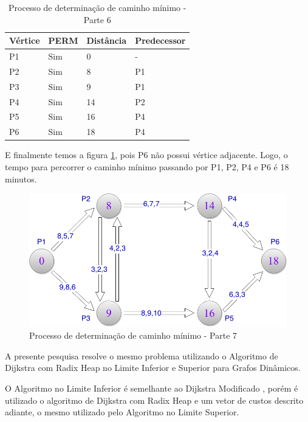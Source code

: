 \begin{table}[htbp]
	\centering
	\begin{tabular}{l l l l}
	\toprule
	Vértice & PERM & Distância & Predecessor\\
	\midrule
	P1 & Sim & 0 & - \\
	P2 & Sim & 8 & P1 \\
	P3 & Sim & 9 & P1 \\
	P4 & Sim & 14 & P2 \\
	P5 & Sim & 16 & P4 \\
	P6 & Sim & 18 & P4 \\
	\bottomrule
	\end{tabular}
\caption{Processo de determinação de caminho mínimo - Parte 6}
 \label{tab:leotab5}
\end{table}
\FloatBarrier

E finalmente temos a figura \ref{fig:leo8}, pois P6 não possui vértice adjacente. Logo, o 
tempo para percorrer o caminho mínimo passando por P1, P2, P4 e P6 é 18 minutos.

\begin{figure}[htbp]
\centering
 \includegraphics[width=.50\textwidth]{chapters/fig/leo8.png}
\caption{Processo de determinação de caminho mínimo - Parte 7}
\label{fig:leo8}
\end{figure}
\FloatBarrier

A presente pesquisa resolve o mesmo problema utilizando o Algoritmo de Dijkstra com Radix Heap no Limite Inferior e Superior
para Grafos Dinâmicos.

O Algoritmo no Limite Inferior é semelhante ao Dijkstra Modificado \cite{leonard}, porém é utilizado o algoritmo
de Dijkstra com Radix Heap e um vetor de custos descrito adiante, o mesmo utilizado pelo Algoritmo no Limite Superior.

